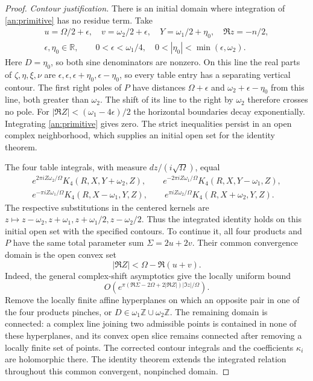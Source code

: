 \documentclass[11pt]{article}
\numberwithin{equation}{section}
\theoremstyle{definition}
\theoremstyle{remark}
\newcommand{\Z}{\mathbb Z}
\newcommand{\R}{\mathbb R}
\begin{document}
\begin{proof}
\emph{Contour justification.}
There is an initial domain where integration of
\eqref{an:primitive} has no residue term.  Take
\begin{gather*}
 u=\Omega/2+\epsilon,\quad v=\omega_2/2+\epsilon,\quad
 Y=\omega_1/2+\eta_0,\quad \Re z=-n/2,\\
 \epsilon,\eta_0\in\R,\qquad
 0<\epsilon<\omega_1/4,\quad0<|\eta_0|<\min(\epsilon,\omega_2).
\end{gather*}
Here $D=\eta_0$, so both sine denominators are nonzero.
On this line the real parts of $\zeta,\eta,\xi,\nu$ are
$\epsilon,\epsilon,\epsilon+\eta_0,\epsilon-\eta_0$, so
every table entry has a separating vertical contour.  The first
right poles of $P$ have distances $\Omega+\epsilon$ and
$\omega_2+\epsilon-\eta_0$ from this line, both greater than $\omega_2$.
The shift of its line to the right by $\omega_2$ therefore crosses no pole.
For $|\Re Z|<(\omega_1-4\epsilon)/2$ the horizontal boundaries decay
exponentially.  Integrating \eqref{an:primitive} gives zero.
The strict inequalities persist in an open complex neighborhood,
which supplies an initial open set for the identity theorem.

The four table integrals, with measure $dz/(i\sqrt\Omega)$, equal
\begin{gather*}
 e^{2\pi iZ\omega_2/\Omega}K_4(R,X,Y+\omega_2,Z),\qquad
 e^{-2\pi iZ\omega_1/\Omega}K_4(R,X,Y-\omega_1,Z),\\
 e^{-\pi iZ\omega_1/\Omega}K_4(R,X-\omega_1,Y,Z),\qquad
 e^{\pi iZ\omega_2/\Omega}K_4(R,X+\omega_2,Y,Z).
\end{gather*}
The respective substitutions in the centered kernels are
$z\mapsto z-\omega_2,z+\omega_1,z+\omega_1/2,z-\omega_2/2$.  Thus the integrated identity
holds on this initial open set with the specified contours.
To continue it, all four products and $P$ have the same total parameter sum
$\Sigma=2u+2v$.  Their common convergence domain is the open convex set
\[
 |\Re Z|<\Omega-\Re(u+v).
\]
Indeed, the general complex-shift asymptotics give the locally uniform
bound
\[
 O\!\left(e^{\pi(\Re\Sigma-2\Omega+2|\Re Z|)|\Im z|/\Omega}\right).
\]
Remove the locally finite affine hyperplanes on which an opposite
pair in one of the four products pinches, or
$D\in\omega_1\Z\cup\omega_2\Z$.  The remaining domain is connected:
a complex line joining two admissible points is contained in none of
these hyperplanes, and its convex open slice remains connected after
removing a locally finite set of points.  The corrected contour
integrals and the coefficients $\kappa_i$ are holomorphic there.
The identity theorem extends the integrated relation throughout this
common convergent, nonpinched domain.


\end{proof}
\end{document}
